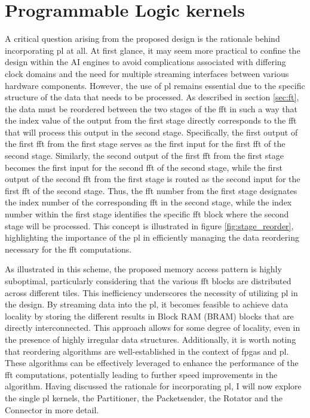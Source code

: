 \section{Programmable Logic kernels}
A critical question arising from the proposed design is the rationale behind incorporating \ac{pl} at all. At first glance, it may seem more practical to confine the design within the AI engines to avoid complications associated with differing clock domains and the need for multiple streaming interfaces between various hardware components. However, the use of \ac{pl} remains essential due to the specific structure of the data that needs to be processed. As described in section \ref{sec:ft}, the data must be reordered between the two stages of the \ac{fft} in such a way that the index value of the output from the first stage directly corresponds to the \ac{fft} that will process this output in the second stage. Specifically, the first output of the first \ac{fft} from the first stage serves as the first input for the first \ac{fft} of the second stage. Similarly, the second output of the first \ac{fft} from the first stage becomes the first input for the second \ac{fft} of the second stage, while the first output of the second \ac{fft} from the first stage is routed as the second input for the first \ac{fft} of the second stage. Thus, the \ac{fft} number from the first stage designates the index number of the corresponding \ac{fft} in the second stage, while the index number within the first stage identifies the specific \ac{fft} block where the second stage will be processed. This concept is illustrated in figure \ref{fig:stage_reorder}, highlighting the importance of the \ac{pl} in efficiently managing the data reordering necessary for the \ac{fft} computations.\par
As illustrated in this scheme, the proposed memory access pattern is highly suboptimal, particularly considering that the various \ac{fft} blocks are distributed across different tiles. This inefficiency underscores the necessity of utilizing \ac{pl} in the design. By streaming data into the \ac{pl}, it becomes feasible to achieve data locality by storing the different results in Block RAM (BRAM) blocks that are directly interconnected. This approach allows for some degree of locality, even in the presence of highly irregular data structures. Additionally, it is worth noting that reordering algorithms are well-established in the context of \ac{fpga}s and \ac{pl}. These algorithms can be effectively leveraged to enhance the performance of the \ac{fft} computations, potentially leading to further speed improvements in the algorithm. Having discussed the rationale for incorporating \ac{pl}, I will now explore the single \ac{pl} kernels, the Partitioner, the Packetsender, the Rotator and the Connector in more detail.\par

